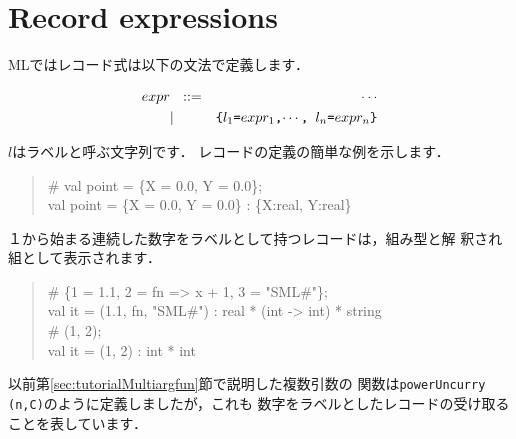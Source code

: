 \documentclass{jbook}
\newif\ifjp
\newcommand{\txt}[2]{#2}
\begin{document}
\section{\txt{レコード構文}{Record expressions}}
\label{sec:extensionRecordExpression}

\ifjp%
	MLではレコード式は以下の文法で定義します．
\begin{tt}
\begin{eqnarray*}
expr &\mbox{\ \ }::=& \cdots \\
     &|& \mbox{\tt \{$l_1$=$expr_1$,$\cdots$, $l_n$=$expr_n$\}}
\end{eqnarray*}
\end{tt}
	$l$はラベルと呼ぶ文字列です．
	レコードの定義の簡単な例を示します．
\begin{tt}
\begin{quote}
\# val point = \{X = 0.0, Y = 0.0\};\\
val point = \{X = 0.0, Y = 0.0\} : \{X:real, Y:real\}
\end{quote}
\end{tt}
	１から始まる連続した数字をラベルとして持つレコードは，組み型と解
釈され組として表示されます．
\begin{tt}
\begin{quote}
\#  \{1 = 1.1, 2 = fn => x + 1, 3 = "SML\#"\};\\
val it = (1.1, fn, "SML\#") : real * (int -> int) * string\\
\# (1, 2);\\
val it = (1, 2) : int * int
\end{quote}
\end{tt}
	以前第\ref{sec:tutorialMultiargfun}節で説明した複数引数の
関数は{\tt powerUncurry (n,C)}のように定義しましたが，これも
数字をラベルとしたレコードの受け取ることを表しています．
\end{document}
